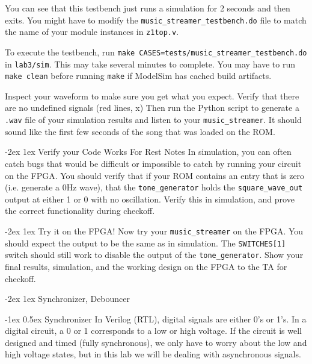 \documentclass[11pt]{article}
\makeatletter
\renewcommand{\section}
{\@startsection {section}{1}{0pt}
 {-2ex}
 {1ex}
 {\bfseries\Large}}
\renewcommand{\subsection}
{\@startsection {subsection}{1}{0pt}
 {-1ex}
 {0.5ex}
 {\bfseries\normalsize}}
\makeatother
\begin{document}
You can see that this testbench just runs a simulation for 2 seconds and then exits. You might have to modify the \verb|music_streamer_testbench.do| file to match the name of your module instances in \verb|z1top.v|.

To execute the testbench, run \verb|make CASES=tests/music_streamer_testbench.do| in \verb|lab3/sim|. This may take several minutes to complete. You may have to run \verb|make clean| before running \verb|make| if ModelSim has cached build artifacts.

Inspect your waveform to make sure you get what you expect. Verify that there are no undefined signals (red lines, x) Then run the Python script to generate a \verb|.wav| file of your simulation results and listen to your \verb|music_streamer|. It should sound like the first few seconds of the song that was loaded on the ROM.

\section{Verify your Code Works For Rest Notes}
In simulation, you can often catch bugs that would be difficult or impossible to catch by running your circuit on the FPGA. You should verify that if your ROM contains an entry that is zero (i.e. generate a 0Hz wave), that the \verb|tone_generator| holds the \verb|square_wave_out| output at either 1 or 0 with no oscillation. Verify this in simulation, and prove the correct functionality during checkoff.

\section{Try it on the FPGA!}
Now try your \verb|music_streamer| on the FPGA. You should expect the output to be the same as in simulation. The \verb|SWITCHES[1]| switch should still work to disable the output of the \verb|tone_generator|. Show your final results, simulation, and the working design on the FPGA to the TA for checkoff.

\section{Synchronizer, Debouncer}

\subsection{Synchronizer}
In Verilog (RTL), digital signals are either 0's or 1's. In a digital circuit, a 0 or 1 corresponds to a low or high voltage. If the circuit is well designed and timed (fully synchronous), we only have to worry about the low and high voltage states, but in this lab we will be dealing with asynchronous signals.
\end{document}
